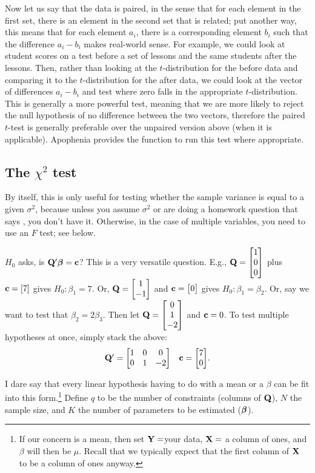 Now let us say that the data is paired, in the sense that for each
element in the first set, there is an element in the second set that is
related; put another way, this means that for each element $a_i$, there
is a corresponding element $b_i$ such that the difference $a_i - b_i$
makes real-world sense. For example, we could look at student scores on
a test before a set of lessons and the same students after the lessons.
Then, rather than looking at the $t$-distribution for the before data
and comparing it to the $t$-distribution for the after data, we could
look at the vector of differences $a_i - b_i$ and test where zero falls
in the appropriate $t$-distribution. This is generally a more powerful test,
meaning that we are more likely to reject the null hypothesis of no
difference between the two vectors, therefore the paired $t$-test is
generally preferable over the unpaired version above (when it is
applicable). Apophenia provides the 
function to run this test where appropriate.

\subsection{The $\chi^2$ test}

By itself, this is only useful for testing whether the sample variance
is equal to a given $\sigma^2$, because unless you assume $\sigma^2$ 
or are doing a homework question that says , you don't have it. Otherwise, in the case of multiple variables, you need to use
an $F$ test; see below.

$H_0$ asks, is ${{\bf Q}'
{\mbox{\boldmath$\beta$}}} = {\bf c}$?  This is a very versatile question. E.g., ${\bf Q} =
\left[\begin{matrix}1\cr 0\cr 0\end{matrix}\right]$ plus ${\bf c} = [7]$ gives $H_0: \beta_1 = 7$. Or, ${\bf Q} = \left[\begin{matrix}1 \cr
-1\end{matrix}\right]$ and ${\bf c} = \left[\begin{matrix}0\end{matrix}\right]$ gives $H_0: \beta_1=\beta_2$. 
Or, say we want to test that $\beta_2 = 2\beta_3$. Then let ${\bf Q}=\left[\begin{matrix}0 \cr 1 \cr -2\end{matrix}\right]$ and ${\bf c} = 0$.
To test multiple hypotheses at once, simply stack the above:
\begin{equation}
\begin{matrix}{\bf Q}' = \left[\begin{matrix}1 & 0 & 0  \cr
                0 &1 &-2\end{matrix}\right] 
                & {\bf c} = \left[\begin{matrix}7 \cr 0\end{matrix}\right]\end{matrix}.\label{qc}\end{equation}

I dare
say that every linear hypothesis having to do with a mean or a $\beta$ can be
fit into this form.\footnote{If our concern is a mean, then set
${\bf Y}=$your data, ${\bf X}=$ a column of ones, and $\beta$ will then be
$\mu$. Recall that we typically expect that the first column of ${\bf X}$ to
be a column of ones anyway.}
Define $q$ to be the number of constraints (columns
of ${\bf Q}$), $N$ the sample size, and $K$ the number of parameters to be
estimated (${\mbox{\boldmath$\beta$}}$).

